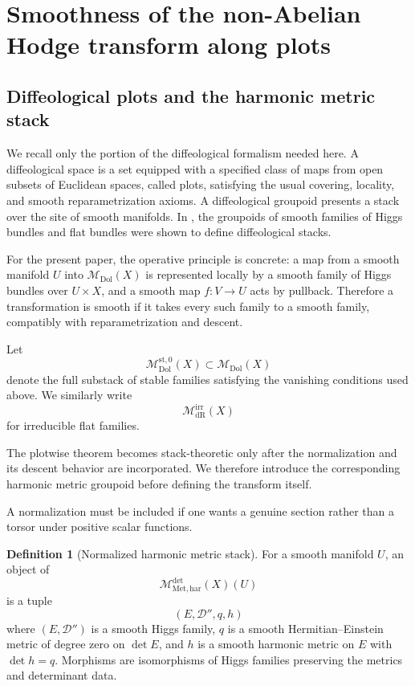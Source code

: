 \documentclass[11pt,reqno]{amsart}
\theoremstyle{definition}
\newtheorem{definition}[theorem]{Definition}
\theoremstyle{remark}
\newcommand{\cD}{\mathcal D}
\newcommand{\Dol}{\mathrm{Dol}}
\newcommand{\dR}{\mathrm{dR}}
\newcommand{\har}{\mathrm{har}}
\newcommand{\st}{\mathrm{st}}
\newcommand{\irr}{\mathrm{irr}}
\newcommand{\MdiffDol}{\mathscr M_{\Dol}}
\newcommand{\MdiffdR}{\mathscr M_{\dR}}
\newcommand{\MetHar}{\mathscr M_{\mathrm{Met},\har}}
\begin{document}
\section{Smoothness of the non-Abelian Hodge transform along plots}\label{sec:stack-smoothness}

\subsection{Diffeological plots and the harmonic metric stack}

We recall only the portion of the diffeological formalism needed here.  A diffeological space is a set equipped with a specified class of maps from open subsets of Euclidean spaces, called plots, satisfying the usual covering, locality, and smooth reparametrization axioms.  A diffeological groupoid presents a stack over the site of smooth manifolds.  In \cite{AzamRayan2026}, the groupoids of smooth families of Higgs bundles and flat bundles were shown to define diffeological stacks.

For the present paper, the operative principle is concrete: a map from a smooth manifold $U$ into $\MdiffDol(X)$ is represented locally by a smooth family of Higgs bundles over $U\times X$, and a smooth map $f:V\to U$ acts by pullback.  Therefore a transformation is smooth if it takes every such family to a smooth family, compatibly with reparametrization and descent.

Let
\[
  \MdiffDol^{\st,0}(X)\subset\MdiffDol(X)
\]
denote the full substack of stable families satisfying the vanishing conditions used above.  We similarly write
\[
  \MdiffdR^{\irr}(X)
\]
for irreducible flat families.


The plotwise theorem becomes stack-theoretic only after the normalization and its descent behavior are incorporated.  We therefore introduce the corresponding harmonic metric groupoid before defining the transform itself.


A normalization must be included if one wants a genuine section rather than a torsor under positive scalar functions.

\begin{definition}[Normalized harmonic metric stack]\label{def:normalized-metric-stack}
For a smooth manifold $U$, an object of
\[
  \MetHar^{\det}(X)(U)
\]
is a tuple
\[
  (E,\cD'',q,h)
\]
where $(E,\cD'')$ is a smooth Higgs family, $q$ is a smooth Hermitian--Einstein metric of degree zero on $\det E$, and $h$ is a smooth harmonic metric on $E$ with $\det h=q$.  Morphisms are isomorphisms of Higgs families preserving the metrics and determinant data.
\end{definition}
\end{document}
